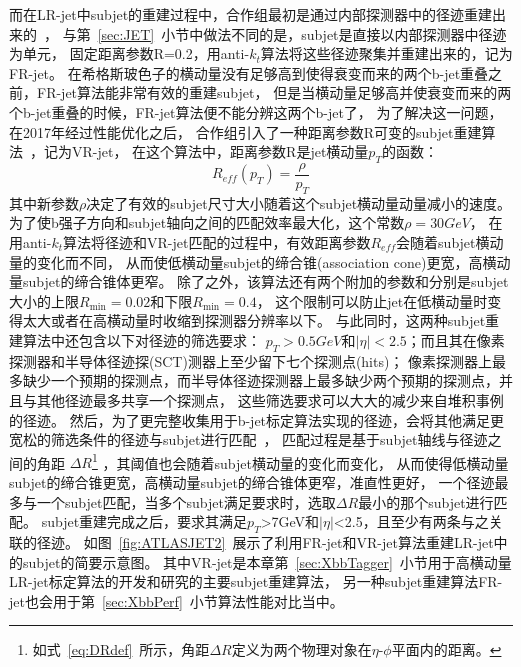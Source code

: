 而在LR-jet中subjet的重建过程中，合作组最初是通过内部探测器中的径迹重建出来的~\cite{TAGGING1,TAGGING5}，
与第~\ref{sec:JET}~小节中做法不同的是，subjet是直接以内部探测器中径迹为单元，
固定距离参数R=0.2，用anti-$k_t$算法将这些径迹聚集并重建出来的，记为FR-jet。
在希格斯玻色子的横动量没有足够高到使得衰变而来的两个b-jet重叠之前，FR-jet算法能非常有效的重建subjet，
但是当横动量足够高并使衰变而来的两个b-jet重叠的时候，FR-jet算法便不能分辨这两个b-jet了，
为了解决这一问题，在2017年经过性能优化之后，
合作组引入了一种距离参数R可变的subjet重建算法~\cite{VRJET1,VRJET2}，记为VR-jet，
在这个算法中，距离参数R是jet横动量$p_T$的函数：
\begin{equation} 
\label{eq:VR}
R_{eff}(p_{T})=\frac{\rho}{p_T}
\end{equation}
其中新参数$\rho$决定了有效的subjet尺寸大小随着这个subjet横动量动量减小的速度。
为了使b强子方向和subjet轴向之间的匹配效率最大化，这个常数$\rho=30GeV$，
在用anti-$k_t$算法将径迹和VR-jet匹配的过程中，有效距离参数$R_{eff}$会随着subjet横动量的变化而不同，
从而使低横动量subjet的缔合锥(association cone)更宽，高横动量subjet的缔合锥体更窄。
除了之外，该算法还有两个附加的参数和分别是subjet大小的上限$R_{\text{min}}=0.02$和下限$R_{\text{min}}=0.4$，
这个限制可以防止jet在低横动量时变得太大或者在高横动量时收缩到探测器分辨率以下。
与此同时，这两种subjet重建算法中还包含以下对径迹的筛选要求：
$p_{T}>0.5GeV$和$|\eta|<2.5$；而且其在像素探测器和半导体径迹探(SCT)测器上至少留下七个探测点(hits)；
像素探测器上最多缺少一个预期的探测点，而半导体径迹探测器上最多缺少两个预期的探测点，并且与其他径迹最多共享一个探测点，
这些筛选要求可以大大的减少来自堆积事例的径迹。
然后，为了更完整收集用于b-jet标定算法实现的径迹，会将其他满足更宽松的筛选条件的径迹与subjet进行匹配~\cite{TRAVR}，
匹配过程是基于subjet轴线与径迹之间的角距
$\Delta R$\footnote{如式~\ref{eq:DRdef}~所示，角距$\Delta R$定义为两个物理对象在$\eta$-$\phi$平面内的距离。}
，其阈值也会随着subjet横动量的变化而变化，
从而使得低横动量subjet的缔合锥更宽，高横动量subjet的缔合锥体更窄，准直性更好，
一个径迹最多与一个subjet匹配，当多个subjet满足要求时，选取$\Delta R$最小的那个subjet进行匹配。
subjet重建完成之后，要求其满足$p_{T}$>7GeV和$|\eta|$<2.5，且至少有两条与之关联的径迹。
如图~\ref{fig:ATLASJET2}~展示了利用FR-jet和VR-jet算法重建LR-jet中的subjet的简要示意图。
其中VR-jet是本章第~\ref{sec:XbbTagger}~小节用于高横动量LR-jet标定算法的开发和研究的主要subjet重建算法，
另一种subjet重建算法FR-jet也会用于第~\ref{sec:XbbPerf}~小节算法性能对比当中。

